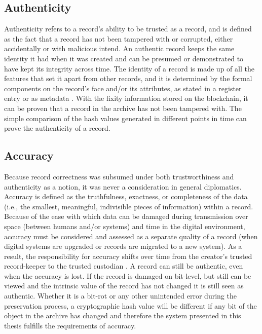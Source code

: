 \subsection{Authenticity}
Authenticity refers to a record's ability to be trusted as a record, and is defined as the fact that a record has not been tampered with or corrupted, either accidentally or with malicious intend. An authentic record keeps the same identity it had when it was created and can be presumed or demonstrated to have kept its integrity across time. The identity of a record is made up of all the features that set it apart from other records, and it is determined by the formal components on the record's face and/or its attributes, as stated in a register entry or as metadata \cite[52]{duranti2009digital}.
With the fixity information stored on the blockchain, it can be proven that a record in the archive has not been tampered with. The simple comparison of the hash values generated in different points in time can prove the authenticity of a record.

\subsection{Accuracy}
Because record correctness was subsumed under both trustworthiness and authenticity as a notion, it was never a consideration in general diplomatics. Accuracy is defined as the truthfulness, exactness, or completeness of the data (i.e., the smallest, meaningful, indivisible pieces of information) within a record. Because of the ease with which data can be damaged during transmission over space (between humans and/or systems) and time in the digital environment, accuracy must be considered and assessed as a separate quality of a record (when digital systems are upgraded or records are migrated to a new system). As a result, the responsibility for accuracy shifts over time from the creator's trusted record-keeper to the trusted custodian \cite[52]{duranti2009digital}.
A record can still be authentic, even when the accuracy is lost. If the record is damaged on bit-level, but still can be viewed and the intrinsic value of the record has not changed it is still seen as authentic.
Whether it is a bit-rot or any other unintended error during the preservation process, a cryptographic hash value will be different if any bit of the object in the archive has changed and therefore the system presented in this thesis fulfills the requirements of accuracy.

